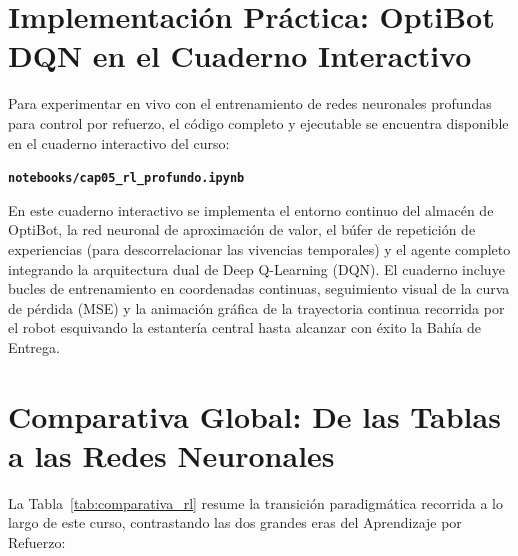 \section{Implementación Práctica: OptiBot DQN en el Cuaderno Interactivo}
Para experimentar en vivo con el entrenamiento de redes neuronales profundas para control por refuerzo, el código completo y ejecutable se encuentra disponible en el cuaderno interactivo del curso:
\begin{center}
  \textbf{\texttt{notebooks/cap05\_rl\_profundo.ipynb}}
\end{center}
En este cuaderno interactivo se implementa el entorno continuo del almacén de OptiBot, la red neuronal de aproximación de valor, el búfer de repetición de experiencias (para descorrelacionar las vivencias temporales) y el agente completo integrando la arquitectura dual de Deep Q-Learning (DQN). El cuaderno incluye bucles de entrenamiento en coordenadas continuas, seguimiento visual de la curva de pérdida (MSE) y la animación gráfica de la trayectoria continua recorrida por el robot esquivando la estantería central hasta alcanzar con éxito la Bahía de Entrega.

\pagebreak
\section{Comparativa Global: De las Tablas a las Redes Neuronales}
La Tabla~\ref{tab:comparativa_rl} resume la transición paradigmática recorrida a lo largo de este curso, contrastando las dos grandes eras del Aprendizaje por Refuerzo:

